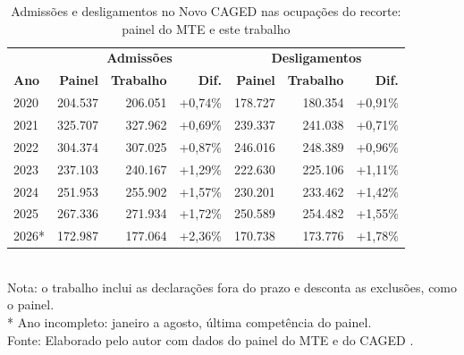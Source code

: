 \begin{table}[htbp]
    \centering
    \caption{Admissões e desligamentos no Novo CAGED nas ocupações do recorte: painel do MTE e este trabalho}
    \label{tab:validacao-caged}
    \footnotesize
    \renewcommand{\arraystretch}{1.25}
    \begin{tabular}{lrrrrrr}
        \toprule
        \rowcolor{black!8}
        & \multicolumn{3}{c}{\textbf{Admissões}} & \multicolumn{3}{c}{\textbf{Desligamentos}} \\
        \rowcolor{black!8}
        \textbf{Ano} & \textbf{Painel} & \textbf{Trabalho} & \textbf{Dif.} & \textbf{Painel} & \textbf{Trabalho} & \textbf{Dif.} \\
        \midrule
        2020 & 204.537 & 206.051 & +0,74\% & 178.727 & 180.354 & +0,91\% \\
        2021 & 325.707 & 327.962 & +0,69\% & 239.337 & 241.038 & +0,71\% \\
        2022 & 304.374 & 307.025 & +0,87\% & 246.016 & 248.389 & +0,96\% \\
        2023 & 237.103 & 240.167 & +1,29\% & 222.630 & 225.106 & +1,11\% \\
        2024 & 251.953 & 255.902 & +1,57\% & 230.201 & 233.462 & +1,42\% \\
        2025 & 267.336 & 271.934 & +1,72\% & 250.589 & 254.482 & +1,55\% \\
        2026* & 172.987 & 177.064 & +2,36\% & 170.738 & 173.776 & +1,78\% \\
        \bottomrule
    \end{tabular}
    \\[4pt]
    Nota: o trabalho inclui as declarações fora do prazo e desconta as exclusões, como o painel. \\
    * Ano incompleto: janeiro a agosto, última competência do painel. \\
    Fonte: Elaborado pelo autor com dados do painel do MTE \cite{PainelMTE2026} e do CAGED \cite{CAGED2024}.
\end{table}

